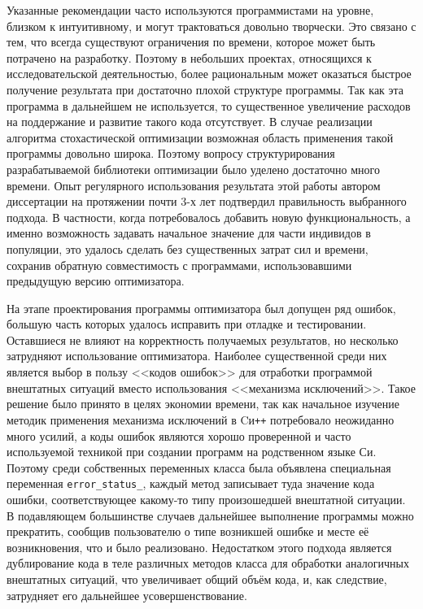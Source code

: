 Указанные рекомендации часто используются программистами на уровне,
близком к интуитивному, и могут трактоваться довольно творчески.  Это
связано с тем, что всегда существуют ограничения по времени, которое
может быть потрачено на разработку. Поэтому в небольших проектах,
относящихся к исследовательской деятельностью, более рациональным может
оказаться быстрое получение результата при достаточно плохой структуре
программы. Так как эта программа в дальнейшем не используется, то существенное
увеличение расходов на поддержание и развитие такого кода
отсутствует. В случае реализации алгоритма стохастической оптимизации
возможная область применения такой программы довольно широка. Поэтому
вопросу структурирования разрабатываемой библиотеки оптимизации было
уделено достаточно много времени.  Опыт регулярного использования
результата этой работы автором диссертации на протяжении почти 3-х лет подтвердил
правильность выбранного подхода.  В частности, когда потребовалось
добавить новую функциональность, а именно возможность задавать
начальное значение для части индивидов в популяции, это удалось
сделать без существенных затрат сил и времени, сохранив обратную
совместимость с программами, использовавшими предыдущую версию
оптимизатора.

На этапе проектирования программы оптимизатора был допущен ряд ошибок,
большую часть которых удалось исправить при отладке и
тестировании. Оставшиеся не влияют на корректность получаемых
результатов, но несколько затрудняют использование оптимизатора.
Наиболее существенной среди них является выбор в пользу <<кодов
ошибок>> для отработки программой внештатных ситуаций вместо
использования <<механизма исключений>>.  Такое решение было принято в
целях экономии времени, так как начальное изучение методик применения
механизма исключений в Cи\texttt{++} потребовало неожиданно много
усилий, а коды ошибок являются хорошо проверенной и часто используемой
техникой при создании программ на родственном языке Си. Поэтому среди
собственных переменных класса была объявлена специальная переменная
\verb+error_status_+, каждый метод записывает туда
значение кода ошибки, соответствующее какому-то типу произошедшей
внештатной ситуации.  В подавляющем большинстве случаев дальнейшее
выполнение программы можно прекратить, сообщив пользователю о типе
возникшей ошибке и месте её возникновения, что и было
реализовано. Недостатком этого подхода является дублирование кода в
теле различных методов класса для обработки аналогичных внештатных
ситуаций, что увеличивает общий объём кода, и, как следствие,
затрудняет его дальнейшее усовершенствование.


